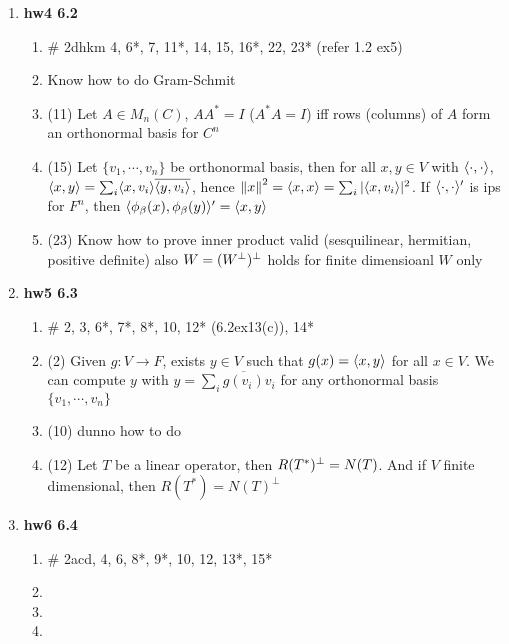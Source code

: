 \documentclass[11pt]{article}
\begin{document}
\begin{enumerate}
    \item \textbf{hw4 6.2}  
    \begin{enumerate}
        \item {} \# 2dhkm 4, 6*, 7, 11*, 14, 15, 16*, 22, 23* (refer 1.2 ex5)
        \item Know how to do Gram-Schmit 
        \item (11) Let $A\in M_{n}(C)$, $AA^* = I$ ($A^*A = I$) iff rows (columns) of $A$ form an orthonormal basis for $C^n$
        \item (15) Let $\{v_1,\cdots, v_n\}$ be orthonormal basis, then for all $x,y\in V$ with $\langle\cdot,\cdot\rangle$, $\langle x,y\rangle = \textstyle\sum_{i} \langle x,v_i\rangle \overline{\langle y,v_i\rangle}$, hence $\left\lVert x\right\rVert^2= \langle x,x\rangle = \textstyle\sum_{i} |\langle x,v_i\rangle|^2$. If $\langle\cdot,\cdot\rangle'$ is ips for $F^n$, then $\langle\phi_{\beta}(x),\phi_{\beta}(y)\rangle' = \langle x,y\rangle$ 
        \item (23) Know how to prove inner product valid (sesquilinear, hermitian, positive definite) also $W = (W^{\perp})^{\perp}$ holds for finite dimensioanl $W$ only 
    \end{enumerate}
    \item \textbf{hw5 6.3} 
    \begin{enumerate}
        \item {}  \# 2, 3, 6*, 7*, 8*, 10, 12* (6.2ex13(c)), 14*
        \item (2) Given $g:V\to F$, exists $y\in V$ such that $g(x) = \langle x,y\rangle$ for all $x\in V$. We can compute $y$ with $y = \textstyle\sum_i \overline{g(v_i)}v_i$ for any orthonormal basis $\{v_1,\cdots, v_n\}$
        \item (10) dunno how to do
        \item (12) Let $T$ be a linear operator, then $R(T^*)^{\perp} = N(T)$. And if $V$ finite dimensional, then $R(T^*) = N(T)^{\perp}$
    \end{enumerate}
    \item \textbf{hw6 6.4} 
    \begin{enumerate}
        \item {} \# 2acd, 4, 6, 8*, 9*, 10, 12, 13*, 15*
        \item {}
        \item {}
        \item {}

\end{enumerate}
\end{enumerate}
\end{document}
